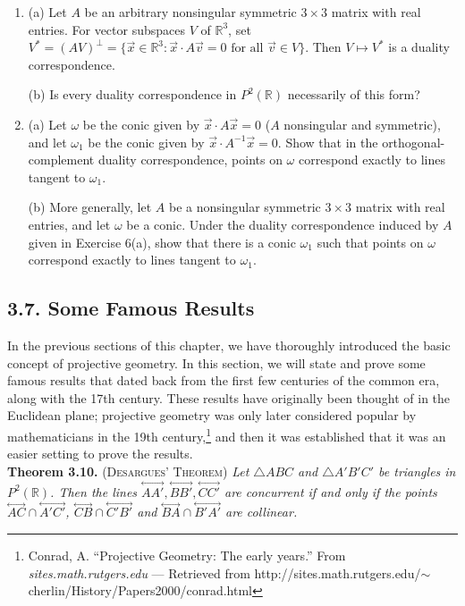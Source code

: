 \documentclass[leqno]{book}
\begin{document}
\begin{enumerate}
\item (a) Let $A$ be an arbitrary nonsingular symmetric $3\times 3$ matrix with real entries.  For vector subspaces $V$ of $\mathbb R^3$, set $V^*=(AV)^\perp=\{\vec x\in\mathbb R^3:\vec x\cdot A\vec v=0\text{ for all }\vec v\in V\}$.  Then $V\mapsto V^*$ is a duality correspondence.

(b) Is every duality correspondence in $P^2(\mathbb R)$ necessarily of this form?

\item (a) Let $\omega$ be the conic given by $\vec x\cdot A\vec x=0$ ($A$ nonsingular and symmetric), and let $\omega_1$ be the conic given by $\vec x\cdot A^{-1}\vec x=0$.  Show that in the orthogonal-complement duality correspondence, points on $\omega$ correspond exactly to lines tangent to $\omega_1$.

(b) More generally, let $A$ be a nonsingular symmetric $3\times 3$ matrix with real entries, and let $\omega$ be a conic.  Under the duality correspondence induced by $A$ given in Exercise 6(a), show that there is a conic $\omega_1$ such that points on $\omega$ correspond exactly to lines tangent to $\omega_1$.
\end{enumerate}

\subsection*{3.7. Some Famous Results}
In the previous sections of this chapter, we have thoroughly introduced the basic concept of projective geometry.  In this section, we will state and prove some famous results that dated back from the first few centuries of the common era, along with the 17th century.  These results have originally been thought of in the Euclidean plane; projective geometry was only later considered popular by mathematicians in the 19th century,\footnote{Conrad, A. ``Projective Geometry: The early years.'' From \emph{sites.math.rutgers.edu} \---- Retrieved from http://sites.math.rutgers.edu/$\sim$cherlin/History/Papers2000/conrad.html} and then it was established that it was an easier setting to prove the results.\\

\noindent\textbf{Theorem 3.10.} \textsc{(Desargues' Theorem)} \emph{Let $\triangle ABC$ and $\triangle A'B'C'$ be triangles in $P^2(\mathbb R)$.  Then the lines $\overset{\longleftrightarrow}{AA'},\overset{\longleftrightarrow}{BB'},\overset{\longleftrightarrow}{CC'}$ are concurrent if and only if the points $\overset{\longleftrightarrow}{AC}\cap\overset{\longleftrightarrow}{A'C'}$, $\overset{\longleftrightarrow}{CB}\cap\overset{\longleftrightarrow}{C'B'}$ and $\overset{\longleftrightarrow}{BA}\cap\overset{\longleftrightarrow}{B'A'}$ are collinear.}\\
\end{document}
